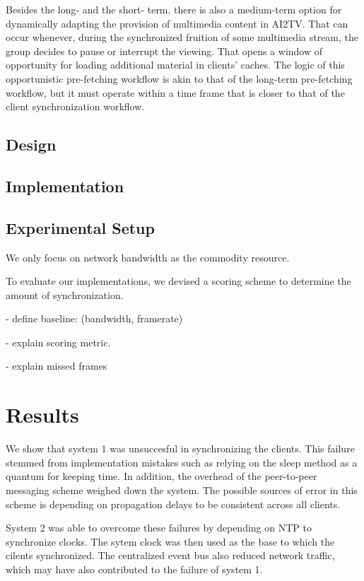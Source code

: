 \documentclass[12pt]{article}
\begin{document}
Besides the long- and the short- term, there is also a medium-term
option for dynamically adapting the provision of multimedia content in
AI2TV. That can occur whenever, during the synchronized fruition of
some multimedia stream, the group decides to pause or interrupt the
viewing. That opens a window of opportunity for loading additional
material in clients' caches. The logic of this opportunistic
pre-fetching workflow is akin to that of the long-term pre-fetching
workflow, but it must operate within a time frame that is closer to
that of the client synchronization workflow.


\subsection{Design} \label{sec:contrib}

\subsection{Implementation} \label{sec:contrib}

\subsection{Experimental Setup} \label{sec:eval}

We only focus on network bandwidth as the commodity resource.

To evaluate our implementations, we devised a scoring scheme
to determine the amount of synchronization.  

- define baseline: (bandwidth, framerate)

- explain scoring metric.  

- explain missed frames

\section{Results} \label{sec:results}

We show that system 1 was unsuccesful in synchronizing
the clients.  This failure stemmed from implementation 
mistakes such as relying on the sleep method as a quantum
for keeping time.  In addition, the overhead of the
peer-to-peer messaging scheme weighed down the system.  The
possible sources of error in this scheme is depending on
propagation delays to be consistent across all clients.


System 2 was able to overcome these failures by depending on
NTP to synchronize clocks.  The sytem clock was then
used as the base to which the cilents synchronized.  The 
centralized event bus also reduced network traffic, which 
may have also contributed to the failure of system 1.
\end{document}
